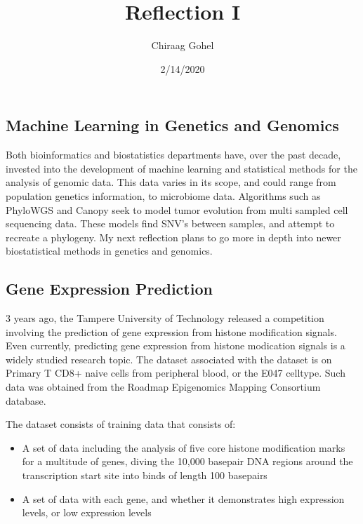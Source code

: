 \documentclass[]{article}
\title{Reflection I}
\author{Chiraag Gohel}
\date{2/14/2020}
\providecommand{\tightlist}{%
  \setlength{\itemsep}{0pt}\setlength{\parskip}{0pt}}
\begin{document}
\maketitle

\hypertarget{machine-learning-in-genetics-and-genomics}{%
\subsection{Machine Learning in Genetics and
Genomics}\label{machine-learning-in-genetics-and-genomics}}

Both bioinformatics and biostatistics departments have, over the past
decade, invested into the development of machine learning and
statistical methods for the analysis of genomic data. This data varies
in its scope, and could range from population genetics information, to
microbiome data. Algorithms such as PhyloWGS and Canopy seek to model
tumor evolution from multi sampled cell sequencing data. These models
find SNV's between samples, and attempt to recreate a phylogeny. My next
reflection plans to go more in depth into newer biostatistical methods
in genetics and genomics.

\hypertarget{gene-expression-prediction}{%
\subsection{Gene Expression
Prediction}\label{gene-expression-prediction}}

3 years ago, the Tampere University of Technology released a competition
involving the prediction of gene expression from histone modification
signals. Even currently, predicting gene expression from histone
modication signals is a widely studied research topic. The dataset
associated with the dataset is on Primary T CD8+ naive cells from
peripheral blood, or the E047 celltype. Such data was obtained from the
Roadmap Epigenomics Mapping Consortium database.

The dataset consists of training data that consists of:

\begin{itemize}
\tightlist
\item
  A set of data including the analysis of five core histone modification
  marks for a multitude of genes, diving the 10,000 basepair DNA regions
  around the transcription start site into binds of length 100 basepairs
\item
  A set of data with each gene, and whether it demonstrates high
  expression levels, or low expression levels
\end{itemize}
\end{document}

